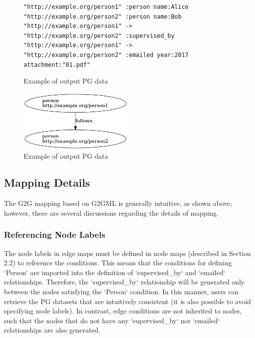 \documentclass[runningheads]{llncs}
\begin{document}
\begin{figure}[!t]
\begin{scriptsize}
\begin{verbatim}
"http://example.org/person1" :person name:Alice
"http://example.org/person2" :person name:Bob
"http://example.org/person1" -> "http://example.org/person2" :supervised_by
"http://example.org/person1" -> "http://example.org/person2" :emailed year:2017 attachment:"01.pdf"
\end{verbatim}
\end{scriptsize}
\caption{Example of output PG data}
\label{fig:example-pg}
\end{figure}


\begin{figure}
\center
\includegraphics[width=0.5\textwidth]{pg_example5.png}
\caption{Example of output PG data}
\label{fig:pg_example5}
\end{figure}


\subsection{Mapping Details}
The G2G mapping based on G2GML is generally intuitive, as shown above; however, there are several discussions regarding the details of mapping.

\subsubsection{Referencing Node Labels}
The node labels in edge maps must be defined in node maps (described in Section 2.2) to reference the conditions. This means that the conditions for defining `Person` are imported into the definition of `supervised\_by` and `emailed` relationships. Therefore, the `supervised\_by` relationship will be generated only between the nodes satisfying the `Person` condition. In this manner, users can retrieve the PG datasets that are intuitively consistent (it is also possible to avoid specifying node labels). In contrast, edge conditions are not inherited to nodes, such that the nodes that do not have any `supervised\_by` nor `emailed` relationships are also generated.
\end{document}
